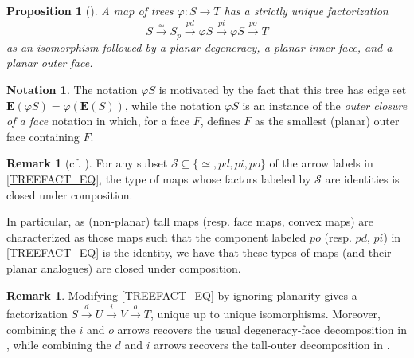 \documentclass[a4paper,10pt]{article}%
\numberwithin{equation}{section}
\numberwithin{figure}{section}
\newtheorem{proposition}[equation]{Proposition}%
\theoremstyle{definition} %
\newtheorem{remark}[equation]{Remark}%
\newtheorem{notation}[equation]{Notation}%
\begin{document}
\begin{proposition}[{\cite[Prop. 2.2]{BP_edss}}]
      \label{TREEFACT_PROP}
      A map of trees $\varphi \colon S \to T$ %
      has a strictly unique factorization
      \begin{equation}\label{TREEFACT_EQ}
              S \xrightarrow{\simeq}
              S_p \xrightarrow{pd} 
              \varphi S \xrightarrow{pi} 
              \overline{\varphi S} \xrightarrow{po} T
      \end{equation}
      as an isomorphism followed by a planar degeneracy, a planar inner face, and a planar outer face.
\end{proposition}


\begin{notation}\label{TREEFACT NOT}
      The notation $\varphi S$ is motivated by the fact that this tree has edge set
      $\boldsymbol{E}(\varphi S) = \varphi (\boldsymbol{E}(S))$,
      while the 
      notation $\overline{\varphi S}$ is an instance of the 
      \emph{outer closure of a face}
      notation in \cite[Not. 2.14]{BP_edss}
      which, for a face $F$, defines $\overline{F}$
      as the smallest (planar) outer face containing $F$.
\end{notation}

\begin{remark}[{cf. \cite[Remarks 2.8, 2.9, 2.13]{BP_TAS}}]
        \label{TREEFACTNAMES_REM}
    For any subset
	$\mathcal{S} \subseteq \{\simeq,pd,pi,po\}$
	of the arrow labels 
	in \eqref{TREEFACT_EQ},
	the type of maps whose
	factors labeled by $\mathcal{S}$ are identities 
	is closed under composition.

        In particular, as (non-planar) tall maps (resp. face maps, convex maps) are characterized as those maps such that
        the component labeled $po$ (resp. $pd$, $pi$)
        in \eqref{TREEFACT_EQ}
        is the identity,
        we have that these types of maps (and their planar analogues) are closed under composition.
\end{remark}

\begin{remark}\label{IGNPL REM}
	Modifying \eqref{TREEFACT_EQ} by ignoring planarity
	gives a factorization 
	$S \xrightarrow{d} U \xrightarrow{i} V
	\xrightarrow{o} T$,
	unique up to unique isomorphisms.
	Moreover, combining the $i$ and $o$ arrows
	recovers the usual degeneracy-face decomposition
	in \cite[Lemma 3.1]{MW07},
	while combining the $d$ and $i$ arrows recovers the 
	tall-outer decomposition in \cite[Prop. 3.36]{BP_geo}.
\end{remark}
\end{document}
